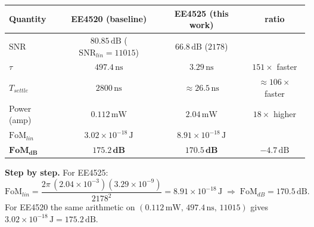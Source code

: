 \documentclass[11pt]{article}
\begin{document}
\begin{table}[H]\centering\small
\begin{tabular}{@{}l c c c@{}}
\toprule
Quantity & EE4520 (baseline) & EE4525 (this work) & ratio \\
\midrule
SNR & $80.85\,\mathrm{dB}$ ($\mathrm{SNR}_{lin}=11015$) & $66.8\,\mathrm{dB}$ ($2178$) & \\
$\tau$ & $497.4\,\mathrm{ns}$ & $3.29\,\mathrm{ns}$ & $151\times$ faster \\
$T_{settle}$ & $2800\,\mathrm{ns}$ & $\approx26.5\,\mathrm{ns}$ & $\approx106\times$ faster \\
Power (amp) & $0.112\,\mathrm{mW}$ & $2.04\,\mathrm{mW}$ & $18\times$ higher \\
$\mathrm{FoM}_{lin}$ & $3.02\times10^{-18}\,\mathrm{J}$ & $8.91\times10^{-18}\,\mathrm{J}$ & \\
$\mathbf{FoM_{dB}}$ & $\mathbf{175.2\,dB}$ & $\mathbf{170.5\,dB}$ & $-4.7\,\mathrm{dB}$ \\
\bottomrule
\end{tabular}
\end{table}

\noindent\textbf{Step by step.} For EE4525:
\[
\mathrm{FoM}_{lin}=\frac{2\pi\,(2.04\times10^{-3})(3.29\times10^{-9})}{2178^2}
=8.91\times10^{-18}\,\mathrm{J}\;\Rightarrow\;\mathrm{FoM}_{dB}=170.5\,\mathrm{dB}.
\]
For EE4520 the same arithmetic on $(0.112\,\mathrm{mW},\,497.4\,\mathrm{ns},\,11015)$
gives $3.02\times10^{-18}\,\mathrm{J}=175.2\,\mathrm{dB}$.
\end{document}

